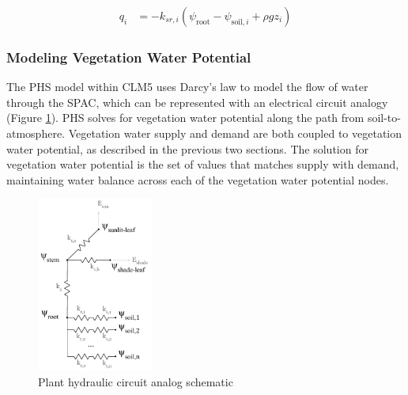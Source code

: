 \documentclass[draft,linenumbers]{agujournal}
\begin{document}
    \begin{linenomath*}
    \begin{equation}
        \begin{aligned}
    q_i &= -k_{sr,i}  \left(\psi_{\text{root}}-\psi_{\text{soil},i}+\rho g z_i\right)
    \label{phs:sink}
    \end{aligned}
    \end{equation}
    \end{linenomath*}

\subsubsection{Modeling Vegetation Water Potential}
\label{sect:vwp}
  The PHS model within CLM5 uses Darcy's law to model the flow of water through the SPAC, which can be represented with an electrical circuit analogy (Figure \ref{circuit}).
  PHS solves for vegetation water potential along the path from soil-to-atmosphere.
  Vegetation water supply and demand are both coupled to vegetation water potential, as described in the previous two sections.
  The solution for vegetation water potential is the set of values that matches supply with demand, maintaining water balance across each of the vegetation water potential nodes.

  \begin{figure}[h]
     \centering
     \includegraphics[width=9pc]{../figs/circuit.pdf}
     \caption{Plant hydraulic circuit analog schematic}
     \label{circuit}
  \end{figure}
\end{document}
